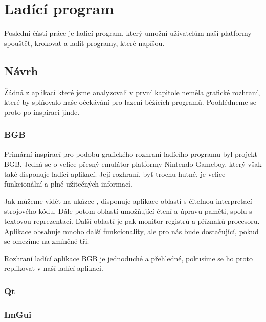 \chapter{Ladící program}

Poslední částí práce je ladicí program, který umožní uživatelům naší platformy spouštět, krokovat a ladit programy, které napíšou.

\section{Návrh}

Žádná z aplikací které jsme analyzovali v první kapitole neměla grafické rozhraní, které by splňovalo naše očekávání pro lazení běžících programů. Poohlédneme se proto po inspiraci jinde.

\subsection{BGB}

Primární inspirací pro podobu grafického rozhraní ladícího programu byl projekt BGB. Jedná se o velice přesný emulátor platformy Nintendo Gameboy, který však také disponuje ladící aplikací. Její rozhraní, byť trochu hutné, je velice funkcionální a plné užitečných informací.


Jak můžeme vidět na ukázce , disponuje aplikace oblastí s čitelnou interpretací strojového kódu. Dále potom oblastí umožňující čtení a úpravu paměti, spolu s textovou reprezentací. Další oblastí je pak monitor registrů a příznaků procesoru. Aplikace obsahuje mnoho další funkcionality, ale pro nás bude dostačující, pokud se omezíme na zmíněné tři.

Rozhraní ladící aplikace BGB je jednoduché a přehledné, pokusíme se ho proto replikovat v naší ladící aplikaci.

\subsection{Qt}

\blind[2]


\subsection{ImGui}

